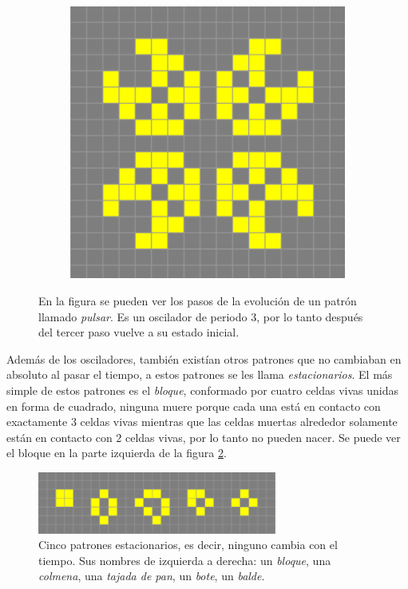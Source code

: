 \begin{figure}[h]
\begin{subfigure}{0.3\textwidth}
    \end{subfigure}
    \begin{subfigure}{0.3\textwidth}
        \includegraphics[width=\textwidth]{images/life-pulsar-3.png}
    \end{subfigure}
    \caption{En la figura se pueden ver los pasos de la evoluci\'on de un patr\'on llamado \textit{pulsar}. Es un oscilador de periodo 3, por lo tanto despu\'es del tercer paso vuelve a su estado inicial.}
    \label{figure:pulsar}
\end{figure}

Adem\'as de los osciladores, tambi\'en exist\'ian otros patrones que no cambiaban en absoluto al pasar el tiempo, a estos patrones se les llama \textit{estacionarios}. El m\'as simple de estos patrones es el \textit{bloque}, conformado por cuatro celdas vivas unidas en forma de cuadrado, ninguna muere porque cada una est\'a en contacto con exactamente $3$ celdas vivas mientras que las celdas muertas alrededor solamente est\'an en contacto con $2$ celdas vivas, por lo tanto no pueden nacer. Se puede ver el bloque en la parte izquierda de la figura \ref{figure:stationary}.

\begin{figure}[h]
    \centering
    \includegraphics[width=0.7\textwidth]{images/life-stationary.png}
    \caption{Cinco patrones estacionarios, es decir, ninguno cambia con el tiempo. Sus nombres de izquierda a derecha: un \textit{bloque}, una \textit{colmena}, una \textit{tajada de pan}, un \textit{bote}, un \textit{balde}.}
    \label{figure:stationary}
\end{figure}

